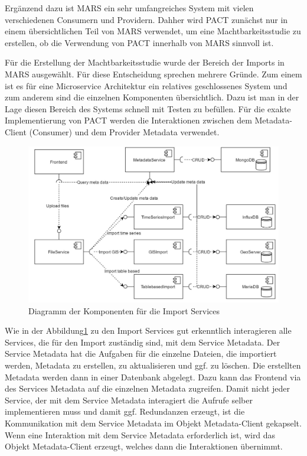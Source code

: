 \documentclass{llncs}
\begin{document}
Ergänzend dazu ist MARS ein sehr umfangreiches System mit vielen verschiedenen Consumern und Providern. Dahher wird PACT zunächst nur in einem übersichtlichen Teil von MARS verwendet, um eine Machtbarkeitsstudie zu erstellen, ob die Verwendung von PACT innerhalb von MARS sinnvoll ist.

Für die Erstellung der Machtbarkeitsstudie wurde der Bereich der Imports in MARS ausgewählt. Für diese Entscheidung sprechen mehrere Gründe. Zum einem ist es für eine Microservice Architektur ein relatives geschlossenes System und zum anderem sind die einzelnen Komponenten übersichtlich. Dazu ist man in der Lage diesen Bereich des Systems schnell mit Testen zu befüllen. Für die exakte Implementierung von PACT werden die Interaktionen zwischen dem Metadata-Client (Consumer) und dem Provider Metadata verwendet.

\begin{figure}[htbp]
  \centering
      \includegraphics[width=1\textwidth]{Images/ImportServices.jpg}
    \caption{Diagramm der Komponenten für die Import Services}
    \label{fig:ImportServices}
\end{figure}

Wie in der Abbildung\ref{fig:ImportServices} zu den Import Services gut erkenntlich interagieren alle Services, die für den Import zuständig sind, mit dem Service Metadata. Der Service Metadata hat die Aufgaben für die einzelne Dateien, die importiert werden, Metadata zu erstellen, zu aktualisieren und ggf. zu löschen. Die erstellten Metadata werden dann in einer Datenbank abgelegt. Dazu kann das Frontend via des Services Metadata auf die einzelnen Metadata zugreifen. Damit nicht jeder Service, der mit dem Service Metadata interagiert die Aufrufe selber implementieren muss und damit ggf. Redundanzen erzeugt, ist die Kommunikation mit dem Service Metadata im Objekt Metadata-Client gekapselt. Wenn eine Interaktion mit dem Service Metadata erforderlich ist, wird das Objekt Metadata-Client erzeugt, welches dann die Interaktionen übernimmt.
\end{document}
